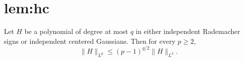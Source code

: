 \chapter{lem:hc}\label{chap:lem_hc}
\begin{lemma}
\label{lem:hc}
Let $H$ be a polynomial of degree at most $q$ in either independent
Rademacher signs or independent centered Gaussians. Then for every
$p \ge 2$,
\[
  \|H\|_{L^p} \le (p-1)^{q/2} \|H\|_{L^2}.
\]
\end{lemma}
